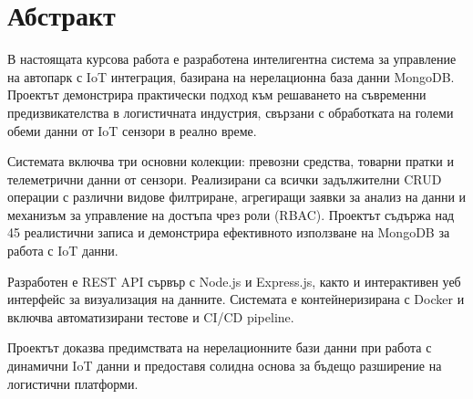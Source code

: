 \section*{Абстракт}

В настоящата курсова работа е разработена интелигентна система за управление на автопарк с IoT интеграция, базирана на нерелационна база данни MongoDB. Проектът демонстрира практически подход към решаването на съвременни предизвикателства в логистичната индустрия, свързани с обработката на големи обеми данни от IoT сензори в реално време.

Системата включва три основни колекции: превозни средства, товарни пратки и телеметрични данни от сензори. Реализирани са всички задължителни CRUD операции с различни видове филтриране, агрегиращи заявки за анализ на данни и механизъм за управление на достъпа чрез роли (RBAC). Проектът съдържа над 45 реалистични записа и демонстрира ефективното използване на MongoDB за работа с IoT данни.

Разработен е REST API сървър с Node.js и Express.js, както и интерактивен уеб интерфейс за визуализация на данните. Системата е контейнеризирана с Docker и включва автоматизирани тестове и CI/CD pipeline.

Проектът доказва предимствата на нерелационните бази данни при работа с динамични IoT данни и предоставя солидна основа за бъдещо разширение на логистични платформи.